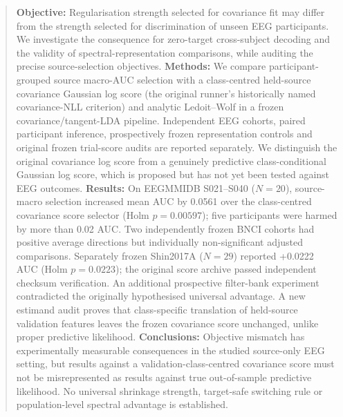 \begin{abstract}
\textbf{Objective:}
Regularisation strength selected for covariance fit may differ from
the strength selected for discrimination of unseen EEG participants.
We investigate the consequence for zero-target cross-subject
decoding and the validity of spectral-representation comparisons,
while auditing the precise source-selection objectives.
\textbf{Methods:}
We compare participant-grouped source macro-AUC selection with a
class-centred held-source covariance Gaussian log score
(the original runner's historically named covariance-NLL criterion)
and analytic Ledoit--Wolf in a frozen covariance/tangent-LDA
pipeline. Independent EEG cohorts, paired participant inference,
prospectively frozen representation controls and original frozen
trial-score audits are reported separately. We distinguish the
original covariance log score from a genuinely predictive
class-conditional Gaussian log score, which is proposed but
has not yet been tested against EEG outcomes.
\textbf{Results:}
On EEGMMIDB S021--S040 (\(N=20\)), source-macro selection
increased mean AUC by 0.0561 over the class-centred covariance
score selector (Holm \(p=0.00597\)); five participants were
harmed by more than 0.02 AUC. Two independently frozen BNCI
cohorts had positive average directions but individually
non-significant adjusted comparisons. Separately frozen
Shin2017A (\(N=29\)) reported +0.0222 AUC (Holm \(p=0.0223\));
the original score archive passed independent checksum
verification. An additional prospective filter-bank experiment
contradicted the originally hypothesised universal advantage.
A new estimand audit proves that class-specific translation
of held-source validation features leaves the frozen
covariance score unchanged, unlike proper predictive likelihood.
\textbf{Conclusions:}
Objective mismatch has experimentally measurable consequences
in the studied source-only EEG setting, but results against
a validation-class-centred covariance score must not be
misrepresented as results against true out-of-sample
predictive likelihood. No universal shrinkage strength,
target-safe switching rule or population-level spectral
advantage is established.
\end{abstract}

